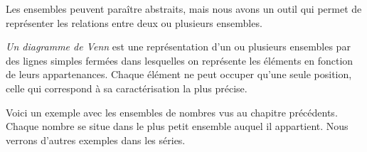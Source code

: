 \documentclass[a4paper,12pt]{report}
\begin{document}
Les ensembles peuvent paraître abstraits, mais nous avons un outil qui permet de représenter les relations entre deux ou plusieurs ensembles.

\begin{defi}
\emph{Un diagramme de Venn} est une représentation d'un ou plusieurs ensembles par des lignes simples fermées dans lesquelles on représente les éléments en fonction de leurs appartenances. 
Chaque élément ne peut occuper qu'une seule position, celle qui correspond à sa caractérisation la plus précise.
\end{defi}

Voici un exemple avec les ensembles de nombres vus au chapitre précédents.
Chaque nombre se situe dans le plus petit ensemble auquel il appartient. 
Nous verrons d'autres exemples dans les séries.
\begin{center}
	\def\natEl{(0,0) ellipse (2cm and 1cm)}
	\def\intEl{(0.5,0) ellipse (3cm and 2cm)}
	\def\ratEl{(1,0) ellipse (4cm and 3cm)}
	\def\realEl{(1.5,0) ellipse (5cm and 4cm)}
\end{center}
\end{document}
